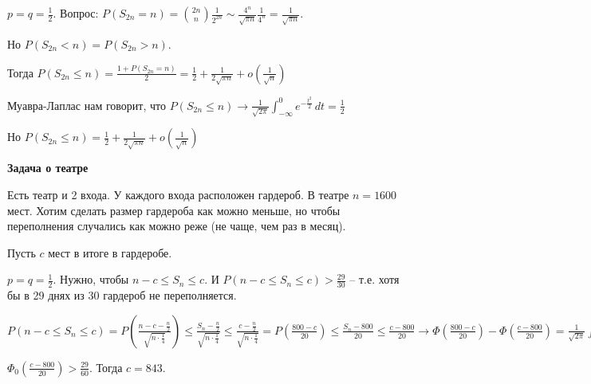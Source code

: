 \begin{example}
    $p = q = \frac{1}{2}$. Вопрос: $P(S_{2n} = n) = \binom{2n}{n} \frac{1}{2^{2n}} \sim
    \frac{4^n}{\sqrt{\pi n}} \frac{1}{4^n} = \frac{1}{\sqrt{\pi n}}$.

    Но $P(S_{2n} < n) = P(S_{2n} > n)$.

    Тогда $P(S_{2n} \leqslant n) = \frac{1 + P(S_{2n} = n)}{2} = \frac{1}{2} + \frac{1}{2\sqrt{\pi n}} + o(\frac{1}{\sqrt{n}})$

    Муавра-Лаплас нам говорит, что $P(S_{2n} \leqslant n) \to \frac{1}{\sqrt{2\pi}} \int_{-\infty}^0 e^{-\frac{t^2}{2}} \, dt = \frac{1}{2}$

    Но $P(S_{2n} \leqslant n) = \frac{1}{2} + \frac{1}{2\sqrt{\pi n}} + o(\frac{1}{\sqrt{n}})$
\end{example}

\begin{example}
    \textbf{Задача о театре}

    Есть театр и 2 входа. У каждого входа расположен гардероб.
    В театре $n = 1600$ мест. Хотим сделать размер гардероба как можно меньше, но чтобы
    переполнения случались как можно реже (не чаще, чем раз в месяц).

    Пусть $c$ мест в итоге в гардеробе.

    $p = q = \frac{1}{2}$. Нужно, чтобы $n - c \leqslant S_n \leqslant c$. И $P(n - c \leqslant S_n \leqslant c) > \frac{29}{30}$ -- т.е. хотя бы в 29 днях из 30 гардероб не переполняется.

    $P(n - c \leqslant S_n \leqslant c) = P(\frac{n - c - \frac{n}{2}}{\sqrt{n \cdot \frac{1}{4}}})
    \leqslant \frac{S_n - \frac{n}{2}}{\sqrt{n \cdot \frac{1}{4}}} \leqslant \frac{c - \frac{n}{2}}{\sqrt{n \cdot \frac{1}{4}}} =
    P(\frac{800 - c}{20}) \leqslant \frac{S_n - 800}{20} \leqslant \frac{c - 800}{20} \to \Phi (\frac{800 - c}{20}) - \Phi (\frac{c - 800}{20}) =
    \frac{1}{\sqrt{2\pi}} \int_{\frac{800 - c}{20}}^{\frac{c - 800}{20}} e^{-\frac{t^2}{2}} \, dt > \frac{29}{30}$

    $\Phi_0 (\frac{c - 800}{20}) > \frac{29}{60}$. Тогда $c = 843$.

\end{example}

